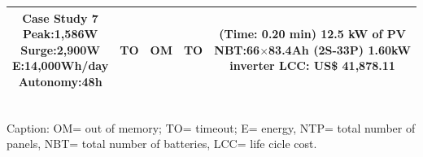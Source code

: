 \documentclass[runningheads]{llncs}
\begin{document}
\begin{table}[!t]
\begin{tabular}{|c|c|c|c|c|}
\hline
\makecell{\textbf{Case Study 7}\\Peak:1,586W\\Surge:2,900W\\E:14,000Wh/day\\Autonomy:48h} & TO & OM & TO & \makecell{(Time: 0.20 min)\\12.5 kW of PV\\NBT:66$\times$83.4Ah (2S-33P)\\1.60kW inverter\\LCC: US\$ 41,878.11} \\
\hline
\hline
\end{tabular}
\\Caption: OM= out of memory; TO= timeout; E= energy, NTP= total number of panels, NBT= total number of batteries, LCC= life cicle cost.
\end{table}
\end{document}
